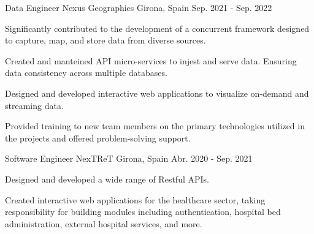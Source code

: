 \begin{cventries}
      \cventry
      {Data Engineer} %
      {Nexus Geographics} %
      {Girona, Spain} %
      {Sep. 2021 - Sep. 2022} %
      {
        \begin{cvitems}
        \item {Significantly contributed to the development of a concurrent
          framework designed to capture, map, and store data from diverse
        sources.}
        \item {Created and manteined API micro-services to injest and serve
          data. Ensuring data consistency across multiple databases.}
        \item {Designed and developed interactive web applications to visualize
          on-demand and streaming data.}
        \item {Provided training to new team members on the primary
          technologies utilized in the projects and offered problem-solving
        support.}
        \end{cvitems}
      }


      \cventry
      {Software Engineer} %
      {NexTReT} %
      {Girona, Spain} %
      {Abr. 2020 - Sep. 2021} %
      {
        \begin{cvitems}
        \item {Designed and developed a wide range of Restful APIs.}
        \item {Created interactive web applications for the healthcare sector,
          taking responsibility for building modules including authentication,
        hospital bed administration, external hospital services, and more.}
        \end{cvitems}
      }

  \end{cventries}
